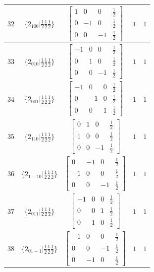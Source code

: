 \documentclass[fleqn,8pt]{jsarticle}
\begin{document}
\begin{longtable}{ccccc}
$ 32 $ & $ \{2{}_{100}|\frac{1}{2} \frac{1}{2} \frac{1}{2}\} $ & $ \begin{bmatrix} 1 & 0 & 0 & \frac{1}{2} \\ 0 & -1 & 0 & \frac{1}{2} \\ 0 & 0 & -1 & \frac{1}{2} \end{bmatrix} $ & $ 1 $ & $ 1 $ \\ \hline
$ 33 $ & $ \{2{}_{010}|\frac{1}{2} \frac{1}{2} \frac{1}{2}\} $ & $ \begin{bmatrix} -1 & 0 & 0 & \frac{1}{2} \\ 0 & 1 & 0 & \frac{1}{2} \\ 0 & 0 & -1 & \frac{1}{2} \end{bmatrix} $ & $ 1 $ & $ 1 $ \\ \hline
$ 34 $ & $ \{2{}_{001}|\frac{1}{2} \frac{1}{2} \frac{1}{2}\} $ & $ \begin{bmatrix} -1 & 0 & 0 & \frac{1}{2} \\ 0 & -1 & 0 & \frac{1}{2} \\ 0 & 0 & 1 & \frac{1}{2} \end{bmatrix} $ & $ 1 $ & $ 1 $ \\ \hline
$ 35 $ & $ \{2{}_{110}|\frac{1}{2} \frac{1}{2} \frac{1}{2}\} $ & $ \begin{bmatrix} 0 & 1 & 0 & \frac{1}{2} \\ 1 & 0 & 0 & \frac{1}{2} \\ 0 & 0 & -1 & \frac{1}{2} \end{bmatrix} $ & $ 1 $ & $ 1 $ \\ \hline
$ 36 $ & $ \{2{}_{1-10}|\frac{1}{2} \frac{1}{2} \frac{1}{2}\} $ & $ \begin{bmatrix} 0 & -1 & 0 & \frac{1}{2} \\ -1 & 0 & 0 & \frac{1}{2} \\ 0 & 0 & -1 & \frac{1}{2} \end{bmatrix} $ & $ 1 $ & $ 1 $ \\ \hline
$ 37 $ & $ \{2{}_{011}|\frac{1}{2} \frac{1}{2} \frac{1}{2}\} $ & $ \begin{bmatrix} -1 & 0 & 0 & \frac{1}{2} \\ 0 & 0 & 1 & \frac{1}{2} \\ 0 & 1 & 0 & \frac{1}{2} \end{bmatrix} $ & $ 1 $ & $ 1 $ \\ \hline
$ 38 $ & $ \{2{}_{01-1}|\frac{1}{2} \frac{1}{2} \frac{1}{2}\} $ & $ \begin{bmatrix} -1 & 0 & 0 & \frac{1}{2} \\ 0 & 0 & -1 & \frac{1}{2} \\ 0 & -1 & 0 & \frac{1}{2} \end{bmatrix} $ & $ 1 $ & $ 1 $ \\ \hline

\end{longtable}
\end{document}
